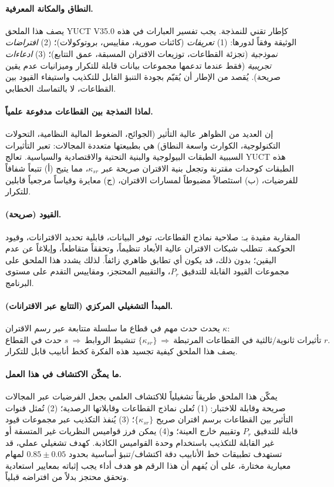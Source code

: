 \documentclass[13pt,a4paper]{article}
\begin{document}
	\paragraph{النطاق والمكانة المعرفية.}
	يصف هذا الملحق YUCT V35.0 كإطار تقني للنمذجة. يجب تفسير العبارات في هذه الوثيقة وفقاً لدورها:
	(1) \emph{تعريفات} (كائنات صورية، مقاييس، بروتوكولات)؛
	(2) \emph{افتراضات نموذجية} (تجزئة القطاعات، توزيعات الاقتران المسبقة، عمق التتابع)؛
	(3) \emph{ادعاءات تجريبية} (فقط عندما تدعمها مجموعات بيانات قابلة للتكرار وميزانيات عدم يقين صريحة).
	يُقصد من الإطار أن يُقيّم بجودة التنبؤ القابل للتكذيب واستيفاء القيود بين القطاعات، لا بالتماسك الخطابي.
	
	\paragraph{لماذا النمذجة بين القطاعات مدفوعة علمياً.}
	إن العديد من الظواهر عالية التأثير (الجوائح، الضغوط المالية النظامية، التحولات التكنولوجية، الكوارث واسعة النطاق) هي بطبيعتها متعددة المجالات: تعبر التأثيرات السببية الطبقات البيولوجية والبنية التحتية والاقتصادية والسياسية. تعالج YUCT هذه الطبقات كوحدات مقترنة وتجعل بنية الاقتران صريحة عبر $\kappa_{sr}$، مما يتيح (أ) تتبعاً شفافاً للفرضيات، (ب) استئصالاً مضبوطاً لمسارات الاقتران، (ج) معايرة وقياساً مرجعياً قابلين للتكرار.
	
	\paragraph{القيود (صريحة).}
	المقاربة مقيدة بـ: صلاحية نماذج القطاعات، توفر البيانات، قابلية تحديد الاقترانات، وقيود الحوكمة. تتطلب شبكات الاقتران عالية الأبعاد تنظيماً، وتحققاً متقاطعاً، وإبلاغاً عن عدم اليقين؛ بدون ذلك، قد يكون أي تطابق ظاهري زائفاً. لذلك يشدد هذا الملحق على مجموعات القيود القابلة للتدقيق $P_r$، والتقييم المحتجز، ومقاييس التقدم على مستوى البرنامج.
	
	\paragraph{المبدأ التشغيلي المركزي (التتابع عبر الاقترانات).}
	يحدث حدث مهم في قطاع ما سلسلة متتابعة عبر رسم الاقتران $\kappa$:
	\[
	\text{حدث في القطاع }s \ \Rightarrow\ \text{تنشيط الروابط }\{\kappa_{sr}\}\ \Rightarrow\ \text{تأثيرات ثانوية/ثالثية في القطاعات المرتبطة }r.
	\]
	يصف هذا الملحق كيفية تجسيد هذه الفكرة كخط أنابيب قابل للتكرار.
	
	\paragraph{ما يمكّن الاكتشاف في هذا العمل.}
	يمكّن هذا الملحق طريقاً تشغيلياً للاكتشاف العلمي بجعل الفرضيات عبر المجالات صريحة وقابلة للاختبار: (1) تُعلن نماذج القطاعات وقابلاتها الرصدية؛ (2) تُمثل قنوات التأثير بين القطاعات برسم اقتران صريح $\{\kappa_{sr}\}$؛ (3) يُنفذ التكذيب عبر مجموعات قيود قابلة للتدقيق $P_r$ وتقييم خارج العينة؛ و(4) يمكن فرز قواميس النظريات غير المتسقة أو غير القابلة للتكذيب باستخدام وحدة القواميس الكاذبة.
	كهدف تشغيلي عملي، قد تستهدف تطبيقات خط الأنابيب دقة اكتشاف/تنبؤ أساسية بحدود $0.85\pm0.05$ لمهام معيارية مختارة، على أن يُفهم أن هذا الرقم هو هدف أداء يجب إثباته بمعايير استعادية وتحقق محتجز بدلاً من افتراضه قبلياً.
	
\end{document}
